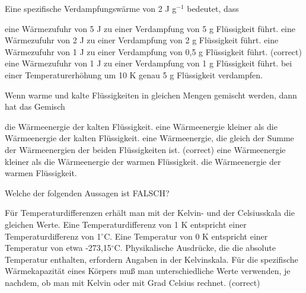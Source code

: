 \documentclass[11pt]{exam}
\begin{document}
\setlength{\voffset}{-0.5in}
\setlength{\headsep}{5pt}

\hspace{2mm}
 \hspace{5mm}
\vspace{4mm}

\begin{questions}

\question Eine spezifische Verdampfungswärme von 2 J g\(^{-1}\) bedeutet, dass

\begin{choices}
	\choice eine Wärmezufuhr von 5 J zu einer Verdampfung von 5 g Flüssigkeit führt.
	\choice eine Wärmezufuhr von 2 J zu einer Verdampfung von 2 g Flüssigkeit führt.
	\choice eine Wärmezufuhr von 1 J zu einer Verdampfung von 0,5 g Flüssigkeit führt. (correct)
	\choice eine Wärmezufuhr von 1 J zu einer Verdampfung von 1 g Flüssigkeit führt.
	\choice bei einer Temperaturerhöhung um 10 K genau 5 g Flüssigkeit verdampfen.
\end{choices}

\vspace{3mm}\question Wenn warme und kalte Flüssigkeiten in gleichen Mengen gemischt werden, dann hat das Gemisch

\begin{choices}
	\choice die Wärmeenergie der kalten Flüssigkeit.
	\choice eine Wärmeenergie kleiner als die Wärmeenergie der kalten Flüssigkeit.
	\choice eine Wärmeenergie, die gleich der Summe der Wärmeenergien der beiden Flüssigkeiten ist. (correct)
	\choice eine Wärmeenergie kleiner als die Wärmeenergie der warmen Flüssigkeit.
	\choice die Wärmeenergie der warmen Flüssigkeit.
\end{choices}

\vspace{3mm}\question Welche der folgenden Aussagen ist FALSCH?

\begin{choices}
	\choice Für Temperaturdifferenzen erhält man mit der Kelvin- und der Celsiusskala die gleichen Werte.
	\choice Eine Temperaturdifferenz von 1 K entspricht einer Temperaturdifferenz von 1\(^\circ\)C.
	\choice Eine Temperatur von 0 K entspricht einer Temperatur von etwa -273,15\(^\circ\)C.
	\choice Physikalische Ausdrücke, die die absolute Temperatur enthalten, erfordern Angaben in der Kelvinskala.
	\choice Für die spezifische Wärmekapazität eines Körpers muß man unterschiedliche Werte verwenden, je nachdem, ob man mit Kelvin oder mit Grad Celsius rechnet. (correct)
\end{choices}


\end{questions}
\end{document}
